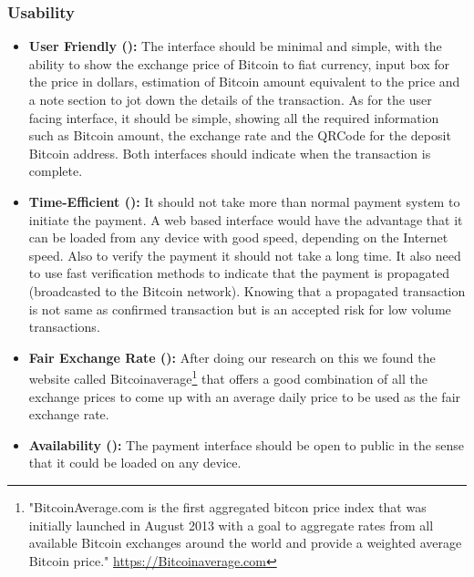 \subsubsection{Usability} 
\begin{itemize}

\item \textbf{User Friendly (\full): } The interface should be minimal and simple, with the ability to show the exchange price of Bitcoin to fiat currency, input box for the price in dollars, estimation of Bitcoin amount equivalent to the price and a note section to jot down the details of the transaction.
As for the user facing interface, it should be simple, showing all the required information such as Bitcoin amount, the exchange rate and the QRCode for the deposit Bitcoin address. Both interfaces should indicate when the transaction is complete.

\item \textbf{Time-Efficient (\full): } It should not take more than normal payment system to initiate the payment. A web based interface would have the advantage that it can be loaded from any device with good speed, depending on the Internet speed. Also to verify the payment it should not take a long time. It also need to use fast verification methods to indicate that the payment is propagated (broadcasted to the Bitcoin network). Knowing that a propagated transaction is not same as confirmed transaction but is an accepted risk for low volume transactions.

\item \textbf{Fair Exchange Rate (\full): } After doing our research on this we found the website called Bitcoinaverage\footnote{"BitcoinAverage.com is the first aggregated bitcon price index that was initially launched in August 2013 with a goal to aggregate rates from all available Bitcoin exchanges around the world and provide a weighted average Bitcoin price." \url{https://Bitcoinaverage.com}} that offers a good combination of all the exchange prices to come up with an average daily price to be used as the fair exchange rate. 

\item \textbf{Availability (\full): } The payment interface should be open to public in the sense that it could be loaded on any device.

\end{itemize}
